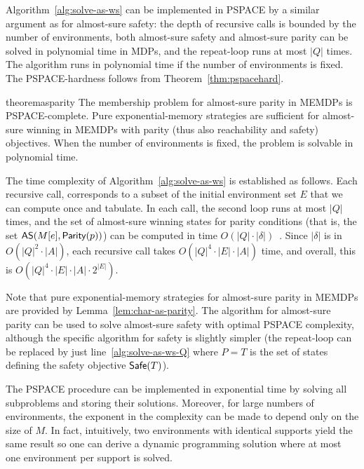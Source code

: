 \documentclass[a4paper,USenglish,cleveref, autoref, thm-restate]{lipics-v2021}
\def\abs#1{\ensuremath{\lvert #1 \rvert}}
\newcommand\almostsure{\textrm{\sf AS}}
\newcommand\Safe{\textrm{\sf Safe}}
\newcommand\Parity{\textrm{\sf Parity}}
\begin{document}
Algorithm~\ref{alg:solve-as-ws} can be implemented in PSPACE by a similar argument
as for almost-sure safety: the depth of recursive calls is bounded by the number
of environments, both almost-sure safety and almost-sure parity can be solved 
in polynomial time in MDPs, and the repeat-loop runs at most $\abs{Q}$ times.
The algorithm runs in polynomial time if the number of environments is fixed.
The PSPACE-hardness follows from Theorem~\ref{thm:pspacehard}.


\begin{restatable}{theorem}{asparity}
\label{th:as-parity}
	The membership problem for almost-sure parity in MEMDPs is PSPACE-complete.
	Pure exponential-memory strategies are sufficient for almost-sure winning in MEMDPs with parity (thus also reachability and safety)
	objectives. When the number of environments is fixed, the problem is solvable in polynomial time.
\end{restatable}

The time complexity of Algorithm~\ref{alg:solve-as-ws} is established as follows. 
Each recursive call, corresponds to a subset of the initial environment set $E$ that we can compute once and tabulate.
In each call, the second loop runs at most $\abs{Q}$ times,
and the set of almost-sure winning states for parity conditions (that is, the set $\almostsure(M[e],\Parity(p))$) can be computed in time $O(\abs{Q}\cdot \abs{\delta})$~\cite{BK08}.
Since $\abs{\delta}$ is in $O(\abs{Q}^2\cdot\abs{A})$,
each recursive call takes $O(\abs{Q}^4\cdot\abs{E}\cdot\abs{A})$ time,
and overall, this is $O(\abs{Q}^4\cdot\abs{E}\cdot\abs{A}\cdot 2^{\abs{E}})$.


Note that pure exponential-memory strategies for almost-sure parity in MEMDPs are provided
by Lemma~\ref{lem:char-as-parity}.
The algorithm for almost-sure parity can be used to solve almost-sure safety
with optimal PSPACE complexity, although the specific algorithm for safety
is slightly simpler (the repeat-loop can be replaced by just line~\ref{alg:solve-as-ws-Q}
where $P = T$ is the set of states defining the safety objective $\Safe(T)$).
 
The PSPACE procedure can be implemented in exponential time by solving
all subproblems and storing their solutions. Moreover,
for large numbers of environments, the exponent in the complexity can be made to depend only on the size of $M$. In fact, intuitively, two environments with identical supports yield the same result so one can derive a dynamic programming solution where at most one environment per support is solved.
\end{document}
